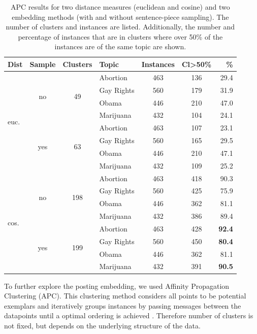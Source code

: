 \documentclass[11pt]{article}
\begin{document}
\begin{table}
  \centering
  \begin{tabular}{lcclccr}
    \toprule
    Dist & Sample & Clusters & Topic & Instances & Cl>50\% & \% \\
    \midrule
    \multirow{8}{*}{euc.} & \multirow{4}{*}{no} & \multirow{4}{*}{49} & Abortion & 463 & 136 & 29.4 \\
         & & & Gay Rights & 560 & 179 & 31.9 \\
         & & & Obama & 446 & 210 & 47.0 \\
         & & & Marijuana & 432 & 104 & 24.1 \\[8pt]
         & \multirow{4}{*}{yes} & \multirow{4}{*}{63} & Abortion & 463 & 107 & 23.1 \\
         & & & Gay Rights & 560 & 165 & 29.5 \\
         & & & Obama & 446 & 210 & 47.1 \\
         & & & Marijuana & 432 & 109 & 25.2\\
    \midrule
    \multirow{8}{*}{cos.} & \multirow{4}{*}{no} & \multirow{4}{*}{198} & Abortion & 463 & 418 & 90.3 \\
         & & & Gay Rights & 560 & 425 & 75.9 \\
         & & & Obama & 446 & 362 & 81.1 \\
         & & & Marijuana & 432 & 386 & 89.4 \\[8pt]
         & \multirow{4}{*}{yes} & \multirow{4}{*}{199} & Abortion & 463 & 428 & \textbf{92.4} \\
         & & & Gay Rights & 560 & 450 & \textbf{80.4} \\
         & & & Obama & 446 & 362 & 81.1 \\
         & & & Marijuana & 432 & 391 & \textbf{90.5} \\
    \bottomrule
  \end{tabular}
  \caption{\label{table:3}APC results for two distance measures (euclidean and cosine)
    and two embedding methods (with and without sentence-piece sampling).
    The number of clusters and instances are listed.
    Additionally, the number and percentage of instances that are in clusters where over 50\% of the instances are of the same topic are shown.}
\end{table}

To further explore the posting embedding, we used Affinity Propagation Clustering (APC).
This clustering method considers all points to be potential exemplars and iteratively groups instances by passing messages between the datapoints until a optimal ordering is achieved \parencite{frey2007clustering}.
Therefore number of clusters is not fixed, but depends on the underlying structure of the data.
\end{document}
